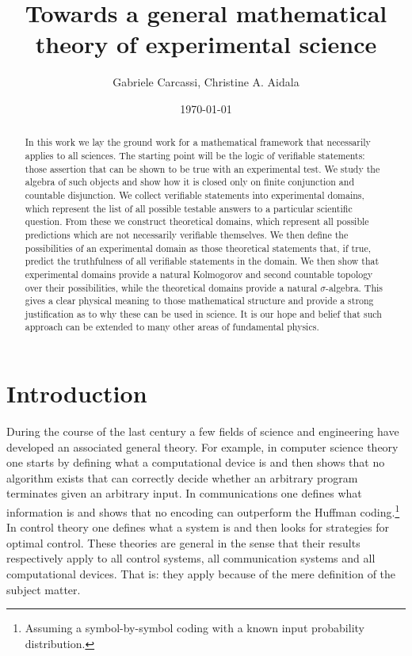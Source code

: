 \documentclass[letterpaper]{article}
\theoremstyle{plain}%
\theoremstyle{definition}
\theoremstyle{remark}
\begin{document}
\title{Towards a general mathematical theory of experimental science}
\author{Gabriele Carcassi, Christine A. Aidala}

\date{\today}

\maketitle

\begin{abstract}
	In this work we lay the ground work for a mathematical framework that necessarily applies to all sciences. The starting point will be the logic of verifiable statements: those assertion that can be shown to be true with an experimental test. We study the algebra of such objects and show how it is closed only on finite conjunction and countable disjunction. We collect verifiable statements into experimental domains, which represent the list of all possible testable answers to a particular scientific question. From these we construct theoretical domains, which represent all possible predictions which are not necessarily verifiable themselves. We then define the possibilities of an experimental domain as those theoretical statements that, if true, predict the truthfulness of all verifiable statements in the domain. We then show that experimental domains provide a natural Kolmogorov and second countable topology over their possibilities, while the theoretical domains provide a natural $\sigma$-algebra. This gives a clear physical meaning to those mathematical structure and provide a strong justification as to why these can be used in science. It is our hope and belief that such approach can be extended to many other areas of fundamental physics.
\end{abstract}


\section{Introduction}

During the course of the last century a few fields of science and engineering have developed an associated general theory. For example, in computer science theory one starts by defining what a computational device is and then shows that no algorithm exists that can correctly decide whether an arbitrary program terminates given an arbitrary input. In communications one defines what information is and shows that no encoding can outperform the Huffman coding.\footnote{Assuming a symbol-by-symbol coding with a known input probability distribution.} In control theory one defines what a system is and then looks for strategies for optimal control. These theories are general in the sense that their results respectively apply to all control systems, all communication systems and all computational devices. That is: they apply because of the mere definition of the subject matter.
\end{document}
